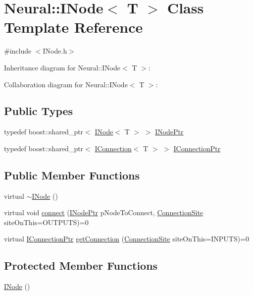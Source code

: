 \hypertarget{class_neural_1_1_i_node}{
\section{Neural::INode$<$ T $>$ Class Template Reference}
\label{class_neural_1_1_i_node}
}


{\ttfamily \#include $<$INode.h$>$}



Inheritance diagram for Neural::INode$<$ T $>$:


Collaboration diagram for Neural::INode$<$ T $>$:
\subsection*{Public Types}
\begin{DoxyCompactItemize}
\item 
typedef boost::shared\_\-ptr$<$ \hyperlink{class_neural_1_1_i_node}{INode}$<$ T $>$ $>$ \hyperlink{class_neural_1_1_i_node_a4a023c757a685125232f9a18a5c588b6}{INodePtr}
\item 
typedef boost::shared\_\-ptr$<$ \hyperlink{class_neural_1_1_i_connection}{IConnection}$<$ T $>$ $>$ \hyperlink{class_neural_1_1_i_node_a5243be0a422bcddc5a71a79920d09fd1}{IConnectionPtr}
\end{DoxyCompactItemize}
\subsection*{Public Member Functions}
\begin{DoxyCompactItemize}
\item 
virtual \hyperlink{class_neural_1_1_i_node_a7f0c78e45d4e552448d9e48e6a212f06}{$\sim$INode} ()
\item 
virtual void \hyperlink{class_neural_1_1_i_node_a04102a5ac425082b6d6bdbcddbc4122b}{connect} (\hyperlink{class_neural_1_1_i_node_a4a023c757a685125232f9a18a5c588b6}{INodePtr} pNodeToConnect, \hyperlink{namespace_neural_add871cb0324e8abfb693026afba3a621}{ConnectionSite} siteOnThis=OUTPUTS)=0
\item 
virtual \hyperlink{class_neural_1_1_i_node_a5243be0a422bcddc5a71a79920d09fd1}{IConnectionPtr} \hyperlink{class_neural_1_1_i_node_ad9f234039e596afa16d9db6ec778ed5b}{getConnection} (\hyperlink{namespace_neural_add871cb0324e8abfb693026afba3a621}{ConnectionSite} siteOnThis=INPUTS)=0
\end{DoxyCompactItemize}
\subsection*{Protected Member Functions}
\begin{DoxyCompactItemize}
\item 
\hyperlink{class_neural_1_1_i_node_afbcab17d8fc08fca43829dc94d98b250}{INode} ()
\end{DoxyCompactItemize}


